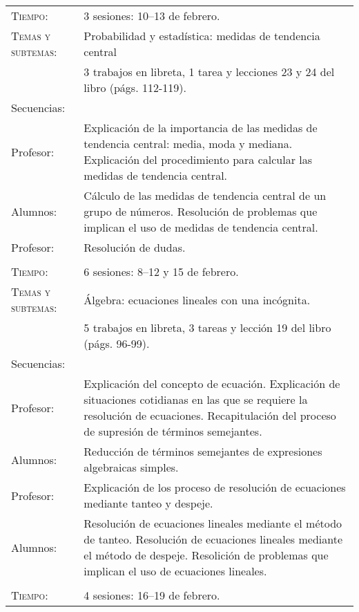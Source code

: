\documentclass[letterpaper,10pt]{article}
\begin{document}
\begin{tabular}[t]{R{0.25\textwidth}p{0.71\textwidth}}
    \textsc{Tiempo:}           & 3 sesiones: 10--13  de febrero. \\
    \textsc{Temas y subtemas:} & Probabilidad y estad\'istica: medidas de
    tendencia central \\
     & 3 trabajos en libreta, 1 tarea y lecciones 23 
    y 24 del libro (p\'ags. 112-119). \\
    \large{\sc Secuencias:} \\
    Profesor:    & Explicaci\'on de la importancia de las medidas de tendencia
    central: media, moda y mediana. Explicaci\'on del procedimiento para 
    calcular las medidas de tendencia central. \\
    Alumnos:     & C\'alculo de las medidas de tendencia central de un grupo de 
    n\'umeros. Resoluci\'on de problemas que implican el uso de medidas de
    tendencia central. \\
    Profesor:   & Resoluci\'on de dudas.
\\ \hline \\
    \textsc{Tiempo:}           & 6 sesiones: 8--12 y 15 de febrero. \\
    \textsc{Temas y subtemas:} & \'Algebra: ecuaciones lineales con una
    inc\'ognita. \\
     & 5 trabajos en libreta, 3 tareas y lecci\'on 19 
    del libro (p\'ags. 96-99). \\
    \large{\sc Secuencias:} \\
    Profesor:    & Explicaci\'on del concepto de ecuaci\'on. Explicaci\'on de 
    situaciones cotidianas en las que se requiere la resoluci\'on de ecuaciones.
    Recapitulaci\'on del proceso de supresi\'on de t\'erminos semejantes. \\
    Alumnos:    & Reducci\'on de t\'erminos semejantes de expresiones 
    algebraicas simples.\\
    Profesor:   & Explicaci\'on de los proceso de resoluci\'on de ecuaciones 
    mediante tanteo y despeje. \\
    Alumnos:    & Resoluci\'on de ecuaciones lineales mediante el m\'etodo de
    tanteo. Resoluci\'on de ecuaciones lineales mediante el m\'etodo de 
    despeje. Resolici\'on de problemas que implican el uso de ecuaciones 
    lineales.
\\ \hline \\
    \textsc{Tiempo:}           & 4 sesiones: 16--19  de febrero. \\

\end{tabular}
\end{document}
